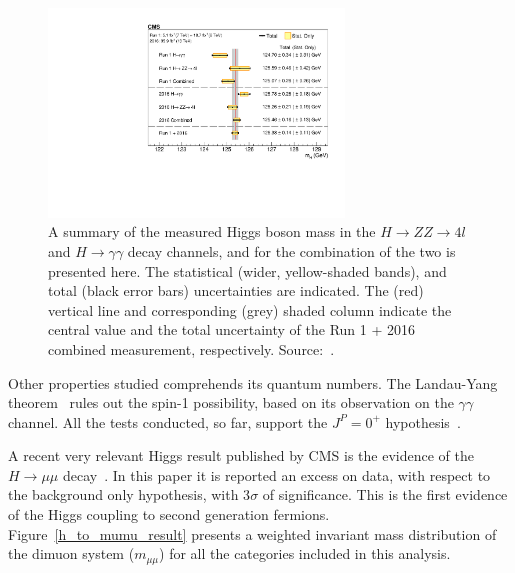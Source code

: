 \begin{figure}[htbp]
  \centering
  \includegraphics[width=0.7\textwidth]{figures_and_tables/theory/cms_higgs_mass.pdf}
  \caption{A summary of the measured Higgs boson mass in the $H \rightarrow ZZ \rightarrow 4l$ and $H \rightarrow \gamma\gamma$ decay channels, and for the combination of the two is presented here. The statistical (wider, yellow-shaded bands), and total (black error bars) uncertainties are indicated. The (red) vertical line and corresponding (grey) shaded column indicate the central value and the total uncertainty of the Run 1 + 2016 combined measurement, respectively. Source:~\cite{Sirunyan:2020xwk}.}
  \label{higgs_mass}
\end{figure}

Other properties studied comprehends its quantum numbers. The Landau-Yang theorem~\cite{Landau:1948kw,Yang:1950rg} rules out the spin-1 possibility, based on its observation on the $\gamma\gamma$ channel. All the tests conducted, so far, support the $J^P = 0^+$ hypothesis~\cite{cms_higgs_spin_tests}.

A recent very relevant Higgs result published by CMS is the evidence of the $H \rightarrow \mu\mu$ decay~\cite{cms_higgs_mumu}. In this paper it is reported an excess on data, with respect to the background only hypothesis, with 3$\sigma$ of significance. This is the first evidence of the Higgs coupling to second generation fermions. Figure~\ref{h_to_mumu_result} presents a weighted invariant mass distribution of the dimuon system ($m_{\mu\mu}$) for all the categories included in this analysis.

